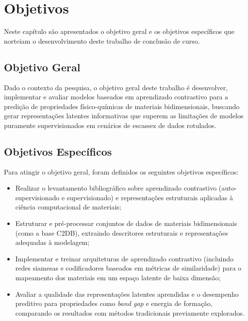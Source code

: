 \chapter{Objetivos}

Neste capítulo são apresentados o objetivo geral e os objetivos específicos que norteiam o desenvolvimento deste trabalho de conclusão de curso.

\section{Objetivo Geral}

Dado o contexto da pesquisa, o objetivo geral deste trabalho é desenvolver, implementar e avaliar modelos baseados em aprendizado contrastivo para a predição de propriedades físico-químicas de materiais bidimensionais, buscando gerar representações latentes informativas que superem as limitações de modelos puramente supervisionados em cenários de escassez de dados rotulados.

\section{Objetivos Específicos}

Para atingir o objetivo geral, foram definidos os seguintes objetivos específicos:

\begin{itemize}
    \item Realizar o levantamento bibliográfico sobre aprendizado contrastivo (auto-supervisionado e supervisionado) e  representações estruturais aplicadas à ciência computacional de materiais;
    \item Estruturar e pré-processar conjuntos de dados de materiais bidimensionais (como a base C2DB), extraindo descritores estruturais e representações adequadas à modelagem;
    \item Implementar e treinar arquiteturas de aprendizado contrastivo (incluindo redes siamesas e codificadores baseados em métricas de similaridade) para o mapeamento dos materiais em um espaço latente de baixa dimensão;
    \item Avaliar a qualidade das representações latentes aprendidas e o desempenho preditivo para propriedades como \textit{band gap} e energia de formação, comparando os resultados com métodos tradicionais previamente explorados.
\end{itemize}
